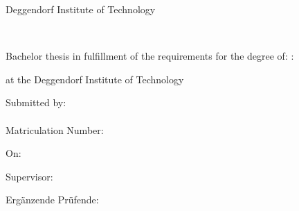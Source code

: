 \begin{titlepage}
\begin{center}
	{
	Deggendorf Institute of Technology\\
	  \faculty\par}
	\vspace{.2cm}
{\Large \studies\\}
\vspace{5.5\baselineskip}
{\thesistitleEN\par}
\vspace{1cm}
{\thesistitleDE\par}
\vspace{5.5\baselineskip}

Bachelor thesis  in fulfillment of the requirements for the degree of:
: %

	\vspace{.2cm}
	\emph{\degree}
	\vspace{.2cm}

at the Deggendorf Institute of Technology\\
\end{center}
\vfill
\parbox[t]{.47\textwidth}{
	Submitted by:\\
	\student\\
	Matriculation Number: \matrnr\par
    \vspace{.5cm}
	On: \submissiondate\par
}
\hfill
\parbox[t]{.35\textwidth}{
Supervisor:\\
\supervisor%

\ifthenelse{\equal{\secsupervisor}{}}{}
{%
\vspace{\baselineskip}
Ergänzende Prüfende:\\
\secsupervisor%
}}
\end{titlepage}
\cleardoublepage\par
